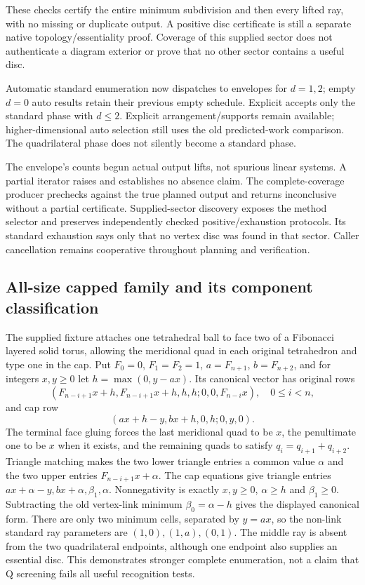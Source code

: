 These checks certify the entire minimum subdivision and then every lifted
ray, with no missing or duplicate output. A positive disc certificate is
still a separate native topology/essentiality proof. Coverage of this
supplied sector does not authenticate a diagram exterior or prove that no
other sector contains a useful disc.

Automatic standard enumeration now dispatches to envelopes for $d=1,2$;
empty $d=0$ auto results retain their previous empty schedule. Explicit
 accepts only the standard phase with $d\le2$.
Explicit arrangement/supports remain available; higher-dimensional auto
selection still uses the old predicted-work comparison. The quadrilateral
phase does not silently become a standard phase.

The envelope's  counts begun actual output lifts, not
spurious linear systems. A partial iterator raises  and
establishes no absence claim. The complete-coverage producer prechecks
 against the true planned output and returns inconclusive
without a partial certificate. Supplied-sector discovery exposes the method
selector and preserves independently checked positive/exhaustion protocols.
Its standard exhaustion says only that no vertex disc was found in that
sector. Caller cancellation remains cooperative throughout planning and
verification.

\subsection{All-size capped family and its component classification}

The supplied fixture attaches one tetrahedral ball to face two of a Fibonacci
layered solid torus, allowing the meridional quad in each original tetrahedron
and type one in the cap. Put $F_0=0$, $F_1=F_2=1$,
$a=F_{n+1}$, $b=F_{n+2}$, and for integers $x,y\ge0$ let
$h=\max(0,y-ax)$. Its canonical vector has original rows
\[
 (F_{n-i+1}x+h,F_{n-i+1}x+h,h,h;0,0,F_{n-i}x),\quad0\le i<n,
\]
and cap row
\[
 (ax+h-y,bx+h,0,h;0,y,0).
\]
The terminal face gluing forces the last meridional quad to be $x$,
the penultimate one to be $x$ when it exists, and the remaining quads
to satisfy $q_i=q_{i+1}+q_{i+2}$. Triangle matching makes the two lower
triangle entries a common value $\alpha$ and the two upper entries
$F_{n-i+1}x+\alpha$. The cap equations give triangle entries
$ax+\alpha-y,bx+\alpha,\beta_1,\alpha$. Nonnegativity is exactly
$x,y\ge0$, $\alpha\ge h$ and $\beta_1\ge0$. Subtracting the old
vertex-link minimum $\beta_0=\alpha-h$ gives the displayed canonical form. There
are only two minimum cells, separated by $y=ax$, so the non-link standard
ray parameters are $(1,0),(1,a),(0,1)$. The middle ray is absent from the
two quadrilateral endpoints, although one endpoint also supplies an
essential disc. This demonstrates stronger complete enumeration, not a
claim that Q screening fails all useful recognition tests.

